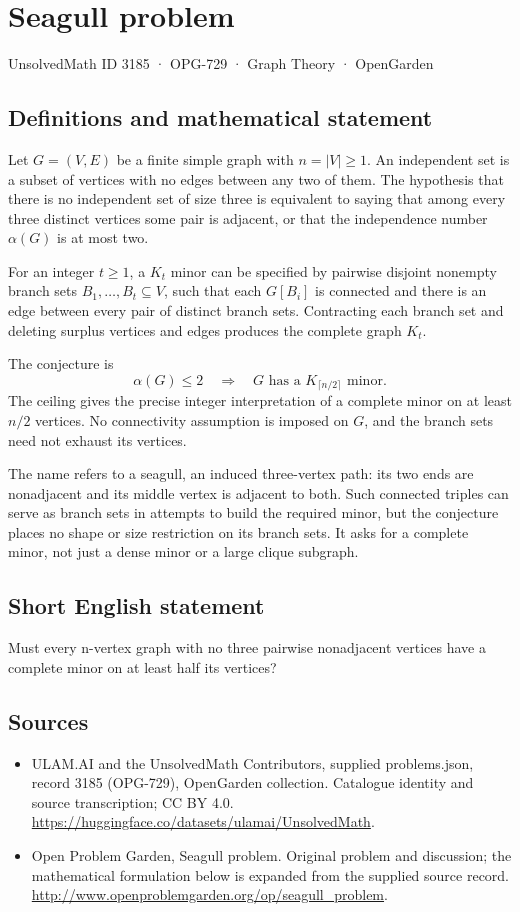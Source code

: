 \documentclass[11pt,a4paper]{article}
\begin{document}
\section*{Seagull problem}\label{3185}
{\small UnsolvedMath ID 3185 · OPG-729 · Graph Theory · OpenGarden}
\subsection{Definitions and mathematical statement}
Let $G=(V,E)$ be a finite simple graph with
$n=|V|\geq1$. An independent set is a subset of vertices
with no edges between any two of them. The hypothesis
that there is no independent set of size three is
equivalent to saying that among every three distinct
vertices some pair is adjacent, or that the independence
number $\alpha(G)$ is at most two.

For an integer $t\geq1$, a $K_t$ minor can be specified
by pairwise disjoint nonempty branch sets
$B_1,\ldots,B_t\subseteq V$, such that each $G[B_i]$
is connected and there is an edge between every pair
of distinct branch sets. Contracting each branch set
and deleting surplus vertices and edges produces the
complete graph $K_t$.

The conjecture is
\[
 \alpha(G)\leq2\quad\Longrightarrow\quad
 G\text{ has a }K_{\lceil n/2\rceil}\text{ minor}.
\]
The ceiling gives the precise integer interpretation
of a complete minor on at least $n/2$ vertices.
No connectivity assumption is imposed on $G$, and
the branch sets need not exhaust its vertices.

The name refers to a seagull, an induced three-vertex
path: its two ends are nonadjacent and its middle
vertex is adjacent to both. Such connected triples
can serve as branch sets in attempts to build the
required minor, but the conjecture places no shape
or size restriction on its branch sets. It asks
for a complete minor, not just a dense minor or
a large clique subgraph.
\subsection{Short English statement}
Must every n-vertex graph with no three pairwise nonadjacent vertices have a complete minor on at least half its vertices?
\subsection{Sources}
\begin{itemize}
\item[S1] ULAM.AI and the UnsolvedMath Contributors, supplied problems.json, record 3185 (OPG-729), OpenGarden collection. Catalogue identity and source transcription; CC BY 4.0.
\url{https://huggingface.co/datasets/ulamai/UnsolvedMath}.
\item[S2] Open Problem Garden, Seagull problem. Original problem and discussion; the mathematical formulation below is expanded from the supplied source record.
\url{http://www.openproblemgarden.org/op/seagull_problem}.
\end{itemize}
\end{document}
